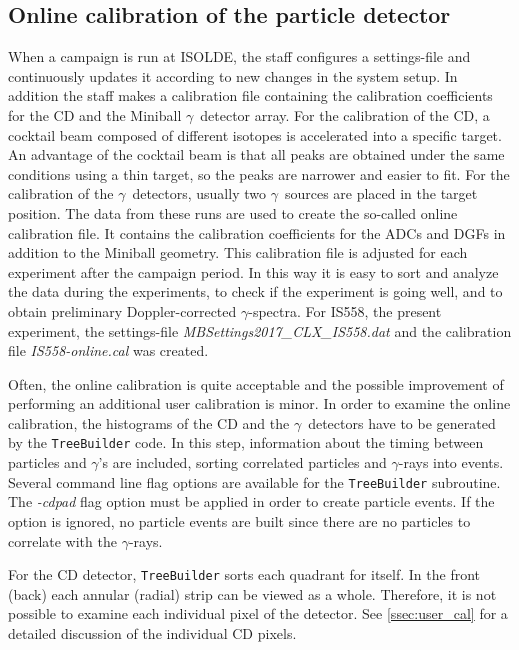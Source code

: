 \documentclass[twoside,english]{uiofysmaster/uiofysmaster}
\newcommand{\ga}{$\gamma$}
\let\orgautoref\autoref
\renewcommand{\autoref}
        {%
		 \def\sectionautorefname{Section}%
		 \def\subsectionautorefname{Section}%
		 \def\subsubsectionautorefname{Section}%
		 \def\chapterautorefname{Chapter}%
          \orgautoref}
\begin{document}
\subsection{Online calibration of the particle detector}\label{ssec:online_cal}
When a campaign is run at ISOLDE, the staff configures a settings-file and continuously updates it according to new changes in the system setup.
In addition the staff makes a calibration file containing the calibration coefficients for the CD and the Miniball \ga\ detector array. 
For the calibration of the CD, a cocktail beam composed of different isotopes is accelerated into a specific target. 
An advantage of the cocktail beam is that all peaks are obtained under the same conditions using a thin target, so the peaks are narrower and easier to fit.
For the calibration of the \ga\ detectors, usually two \ga\ sources are placed in the target position.
The data from these runs are used to create the so-called online calibration file. 
It contains the calibration coefficients for the ADCs and DGFs in addition to the Miniball geometry.
This calibration file is adjusted for each experiment after the campaign period.
In this way it is easy to sort and analyze the data during the experiments, to check if the experiment is going well, and to obtain preliminary Doppler-corrected \ga-spectra.
For IS558, the present experiment, the settings-file \textit{MBSettings2017\_CLX\_IS558.dat} and the calibration file \textit{IS558-online.cal} was created.

Often, the online calibration is quite acceptable and the possible improvement of performing an additional user calibration is minor. 
In order to examine the online calibration, the histograms of the CD and the \ga\ detectors have to be generated by the \texttt{TreeBuilder} code. 
In this step, information about the timing between particles and \ga's are included, sorting correlated particles and \ga-rays into events. 
Several command line flag options are available for the \texttt{TreeBuilder} subroutine. 
The \textit{-cdpad} flag option must be applied in order to create particle events. 
If the option is ignored, no particle events are built since there are no particles to correlate with the \ga-rays.

For the CD detector, \texttt{TreeBuilder} sorts each quadrant for itself. 
In the front (back) each annular (radial) strip can be viewed as a whole.
Therefore, it is not possible to examine each individual pixel of the detector. 
See \autoref{ssec:user_cal} for a detailed discussion of the individual CD pixels.
\end{document}
